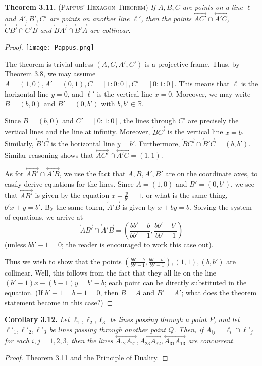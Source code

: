\documentclass[leqno]{book}
\begin{document}
\noindent\textbf{Theorem 3.11.} \textsc{(Pappus' Hexagon Theorem)} \emph{If $A,B,C$ are points on a line $\ell$ and $A',B',C'$ are points on another line $\ell'$, then the points $\overset{\longleftrightarrow}{AC'}\cap\overset{\longleftrightarrow}{A'C}$, $\overset{\longleftrightarrow}{CB'}\cap\overset{\longleftrightarrow}{C'B}$ and $\overset{\longleftrightarrow}{BA'}\cap\overset{\longleftrightarrow}{B'A}$ are collinear.}
\begin{proof}
\texttt{[image: Pappus.png]}

The theorem is trivial unless $(A,C,A',C')$ is a projective frame.  Thus, by Theorem 3.8, we may assume $A=(1,0),A'=(0,1),C=[1:0:0],C'=[0:1:0]$.  This means that $\ell$ is the horizontal line $y=0$, and $\ell'$ is the vertical line $x=0$.  Moreover, we may write $B=(b,0)$ and $B'=(0,b')$ with $b,b'\in\mathbb R$.

Since $B=(b,0)$ and $C'=[0:1:0]$, the lines through $C'$ are precisely the vertical lines and the line at infinity.  Moreover, $\overset{\longleftrightarrow}{BC'}$ is the vertical line $x=b$.  Similarly, $\overset{\longleftrightarrow}{B'C}$ is the horizontal line $y=b'$.  Furthermore, $\overset{\longleftrightarrow}{BC'}\cap\overset{\longleftrightarrow}{B'C}=(b,b')$.  Similar reasoning shows that $\overset{\longleftrightarrow}{AC'}\cap\overset{\longleftrightarrow}{A'C}=(1,1)$.

As for $\overset{\longleftrightarrow}{AB'}\cap\overset{\longleftrightarrow}{A'B}$, we use the fact that $A,B,A',B'$ are on the coordinate axes, to easily derive equations for the lines.  Since $A=(1,0)$ and $B'=(0,b')$, we see that $\overset{\longleftrightarrow}{AB'}$ is given by the equation $x+\frac y{b'}=1$, or what is the same thing, $b'x+y=b'$.  By the same token, $\overset{\longleftrightarrow}{A'B}$ is given by $x+by=b$.  Solving the system of equations, we arrive at
$$\overset{\longleftrightarrow}{AB'}\cap\overset{\longleftrightarrow}{A'B}=\left(\frac{bb'-b}{bb'-1},\frac{bb'-b'}{bb'-1}\right)$$
(unless $bb'-1=0$; the reader is encouraged to work this case out).

Thus we wish to show that the points $\left(\frac{bb'-b}{bb'-1},\frac{bb'-b'}{bb'-1}\right),(1,1),(b,b')$ are collinear.  Well, this follows from the fact that they all lie on the line $(b'-1)x-(b-1)y=b'-b$; each point can be directly substituted in the equation.  (If $b'-1=b-1=0$, then $B=A$ and $B'=A'$; what does the theorem statement become in this case?)
\end{proof}
\noindent\textbf{Corollary 3.12.} \emph{Let $\ell_1,\ell_2,\ell_3$ be lines passing through a point $P$, and let $\ell'_1,\ell'_2,\ell'_3$ be lines passing through another point $Q$.  Then, if $A_{ij}=\ell_i\cap\ell'_j$ for each $i,j=1,2,3$, then the lines $\overset{\longleftrightarrow}{A_{12}A_{21}},\overset{\longleftrightarrow}{A_{23}A_{32}},\overset{\longleftrightarrow}{A_{31}A_{13}}$ are concurrent.}
\begin{proof}
Theorem 3.11 and the Principle of Duality.
\end{proof}
\end{document}

